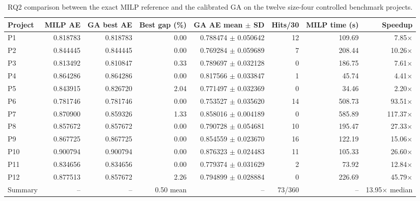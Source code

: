 \documentclass[conference]{IEEEtran}
\begin{document}
\clearpage
\begin{table}[!t]
\centering
\scriptsize
\setlength{\tabcolsep}{4pt}
\caption{RQ2 comparison between the exact MILP reference and the calibrated GA on the twelve size-four controlled benchmark projects.}
\label{tab:rq2-ilp-ga-summary}
\begin{tabular}{lrrrrrrr}
\hline
Project & MILP AE & GA best AE & Best gap (\%) & GA AE mean $\pm$ SD & Hits/30 & MILP time (s) & Speedup \\
\hline
P1  & 0.818783 & 0.818783 & 0.00 & 0.788474 $\pm$ 0.050642 & 12 & 109.69  & 7.85$\times$ \\
P2  & 0.844445 & 0.844445 & 0.00 & 0.769284 $\pm$ 0.059689 & 7  & 208.44  & 10.26$\times$ \\
P3  & 0.813492 & 0.810847 & 0.33 & 0.789697 $\pm$ 0.032128 & 0  & 186.75  & 7.61$\times$ \\
P4  & 0.864286 & 0.864286 & 0.00 & 0.817566 $\pm$ 0.033847 & 1  & 45.74   & 4.41$\times$ \\
P5  & 0.843915 & 0.826720 & 2.04 & 0.771497 $\pm$ 0.032369 & 0  & 34.46   & 2.20$\times$ \\
P6  & 0.781746 & 0.781746 & 0.00 & 0.753527 $\pm$ 0.035620 & 14 & 508.73  & 93.51$\times$ \\
P7  & 0.870900 & 0.859326 & 1.33 & 0.858016 $\pm$ 0.004189 & 0  & 585.89  & 117.37$\times$ \\
P8  & 0.857672 & 0.857672 & 0.00 & 0.790728 $\pm$ 0.054681 & 10 & 195.47  & 27.33$\times$ \\
P9  & 0.867725 & 0.867725 & 0.00 & 0.854559 $\pm$ 0.023670 & 16 & 122.19  & 15.06$\times$ \\
P10 & 0.900794 & 0.900794 & 0.00 & 0.876323 $\pm$ 0.024483 & 11 & 105.33  & 26.60$\times$ \\
P11 & 0.834656 & 0.834656 & 0.00 & 0.779374 $\pm$ 0.031629 & 2  & 73.92   & 12.84$\times$ \\
P12 & 0.877513 & 0.857672 & 2.26 & 0.794899 $\pm$ 0.028884 & 0  & 226.69  & 45.79$\times$ \\
\hline
Summary & -- & -- & 0.50 mean & -- & 73/360 & -- & 13.95$\times$ median \\
\hline
\end{tabular}
\end{table}
\end{document}
